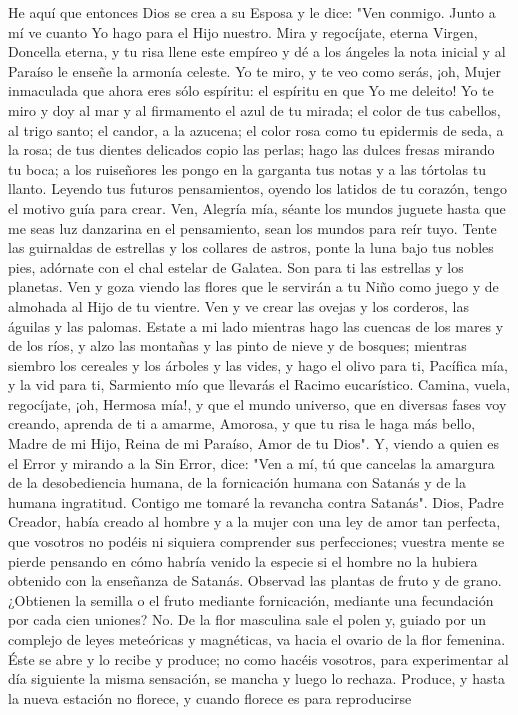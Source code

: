 \documentclass[12pt]{book} %
\begin{document}
He aquí que entonces Dios se crea a su Esposa y le dice: "Ven conmigo. Junto a mí ve cuanto Yo hago para el Hijo 
nuestro. Mira y regocíjate, eterna Virgen, Doncella eterna, y tu risa llene este empíreo y dé a los ángeles la nota inicial y al Paraíso le enseñe la armonía celeste. Yo te miro, y te veo como serás, ¡oh, Mujer inmaculada que ahora eres sólo espíritu: el espíritu en que Yo me deleito! Yo te miro y doy al mar y al firmamento el azul de tu mirada; el color de tus cabellos, al trigo santo; el candor, a la azucena; el color rosa como tu epidermis de seda, a la rosa; de tus dientes delicados copio las perlas; hago las dulces fresas mirando tu boca; a los ruiseñores les pongo en la garganta tus notas y a las tórtolas tu llanto. Leyendo tus futuros pensamientos, oyendo los latidos de tu corazón, tengo el motivo guía para crear. Ven, Alegría mía, séante los mundos juguete hasta que me seas luz danzarina en el pensamiento, sean los mundos para reír tuyo. Tente las guirnaldas de estrellas y los collares de astros, ponte la luna bajo tus nobles pies, adórnate con el chal estelar de Galatea. Son para ti las estrellas y los planetas. Ven y goza viendo las flores que le servirán a tu Niño como juego y de almohada al Hijo de tu vientre. Ven y ve crear las ovejas y los corderos, las águilas y las palomas. Estate a mi lado mientras hago las cuencas de los mares y de los ríos, y alzo las montañas y las pinto de nieve y de bosques; mientras siembro los cereales y los árboles y las vides, y hago el olivo para ti, Pacífica mía, y la vid para ti, Sarmiento mío que llevarás el Racimo eucarístico. Camina, vuela, regocíjate, ¡oh, Hermosa mía!, y que el mundo universo, que en diversas fases voy creando, aprenda de ti a amarme, Amorosa, y que tu risa le haga más bello, Madre de mi Hijo, Reina de mi Paraíso, Amor de tu Dios". Y, viendo a quien es el Error y mirando a la Sin Error, dice: "Ven a mí, tú que cancelas la amargura de la desobediencia humana, de la fornicación humana con Satanás y de la humana ingratitud. Contigo me tomaré la revancha contra Satanás". 
Dios, Padre Creador, había creado al hombre y a la mujer con una ley de amor tan perfecta, que vosotros no podéis ni siquiera comprender sus perfecciones; vuestra mente se pierde pensando en cómo habría venido la especie si el hombre no la hubiera obtenido con la enseñanza de Satanás. 
Observad las plantas de fruto y de grano. ¿Obtienen la semilla o el fruto mediante fornicación, mediante una fecundación por cada cien uniones? No. De la flor masculina sale el polen y, guiado por un complejo de leyes meteóricas y magnéticas, va hacia el ovario de la flor femenina. Éste se abre y lo recibe y produce; no como hacéis vosotros, para experimentar al día siguiente la misma sensación, se mancha y luego lo rechaza. Produce, y hasta la nueva estación no florece, y cuando florece es para reproducirse 
\end{document}
